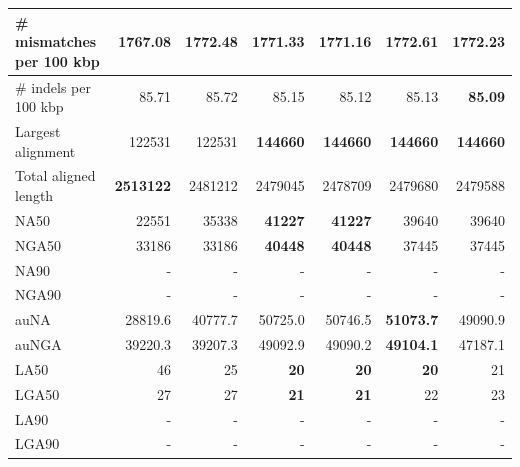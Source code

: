 \documentclass[12pt,a4paper]{article}
\begin{document}
\begin{table}[ht]
\begin{center}
\begin{tabular}{|l*{6}{|r}|}
\# mismatches per 100 kbp & {\bf 1767.08} & 1772.48 & 1771.33 & 1771.16 & 1772.61 & 1772.23 \\ \hline
\# indels per 100 kbp & 85.71 & 85.72 & 85.15 & 85.12 & 85.13 & {\bf 85.09} \\ \hline
Largest alignment & 122531 & 122531 & {\bf 144660} & {\bf 144660} & {\bf 144660} & {\bf 144660} \\ \hline
Total aligned length & {\bf 2513122} & 2481212 & 2479045 & 2478709 & 2479680 & 2479588 \\ \hline
NA50 & 22551 & 35338 & {\bf 41227} & {\bf 41227} & 39640 & 39640 \\ \hline
NGA50 & 33186 & 33186 & {\bf 40448} & {\bf 40448} & 37445 & 37445 \\ \hline
NA90 & - & - & - & - & - & - \\ \hline
NGA90 & - & - & - & - & - & - \\ \hline
auNA & 28819.6 & 40777.7 & 50725.0 & 50746.5 & {\bf 51073.7} & 49090.9 \\ \hline
auNGA & 39220.3 & 39207.3 & 49092.9 & 49090.2 & {\bf 49104.1} & 47187.1 \\ \hline
LA50 & 46 & 25 & {\bf 20} & {\bf 20} & {\bf 20} & 21 \\ \hline
LGA50 & 27 & 27 & {\bf 21} & {\bf 21} & 22 & 23 \\ \hline
LA90 & - & - & - & - & - & - \\ \hline
LGA90 & - & - & - & - & - & - \\ \hline
\end{tabular}
\end{center}
\end{table}
\end{document}
